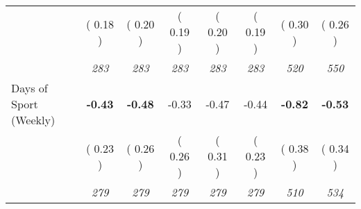 \begin{tabular}{l c c c c c c c}
& (     0.18 ) & (     0.20 ) & (     0.19 ) & (     0.20 ) & (     0.19 ) & (     0.30 ) & (     0.26 ) \\
& \textit{ 283 } & \textit{ 283 } & \textit{ 283 } & \textit{ 283 } & \textit{ 283 } & \textit{ 520 } & \textit{ 550 } \\
Days of Sport (Weekly) & \textbf{     -0.43 } & \textbf{     -0.48 } &     -0.33 &     -0.47 &     -0.44 & \textbf{     -0.82 } & \textbf{     -0.53 } \\
& (     0.23 ) & (     0.26 ) & (     0.26 ) & (     0.31 ) & (     0.23 ) & (     0.38 ) & (     0.34 ) \\
& \textit{ 279 } & \textit{ 279 } & \textit{ 279 } & \textit{ 279 } & \textit{ 279 } & \textit{ 510 } & \textit{ 534 } \\
\bottomrule
\end{tabular}
